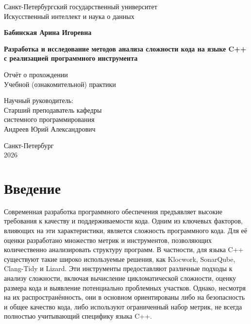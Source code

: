 \documentclass[a4paper,12pt]{article}
\begin{document}
\begin{titlepage}
    \begin{center}
        Санкт-Петербургский государственный университет\\
        Искусственный интеллект и наука о данных\\
        
        \vfill
    
        {\fontsize{14}{16}\selectfont \textbf{Бабинская Арина Игоревна} \par}
        
        \vspace{1cm}
        
        {\fontsize{16}{18}\selectfont \textbf{Разработка и исследование методов анализа сложности кода на языке C++ с реализацией программного инструмента} \par}
        
        \vspace{0.5cm}
        {\fontsize{14}{16}\selectfont Отчёт о прохождении \\ Учебной (ознакомительной) практики \par}
        
        \vfill
        
        \begin{flushright}
            Научный руководитель:\\
            Старший преподаватель кафедры \\
            системного программирования \\
            Андреев Юрий Александрович
        \end{flushright}
        
        \vfill
        
        Санкт-Петербург\\
        2026
    \end{center}
\end{titlepage}

\newpage


\tableofcontents
\newpage


\section*{Введение}

Современная разработка программного обеспечения предъявляет высокие требования к качеству и поддерживаемости кода. Одним из ключевых факторов, влияющих на эти характеристики, является сложность программного кода. Для её оценки разработано множество метрик и инструментов, позволяющих количественно анализировать структуру программ. В частности, для языка C++ существуют такие широко используемые решения, как Klocwork, SonarQube, Clang-Tidy и Lizard. Эти инструменты предоставляют различные подходы к анализу сложности, включая вычисление цикломатической сложности, оценку размера кода и выявление потенциально проблемных участков. Однако, несмотря на их распространённость, они в основном ориентированы либо на безопасность и общее качество кода, либо используют ограниченный набор метрик, не всегда полностью учитывающий специфику языка C++.
\end{document}
